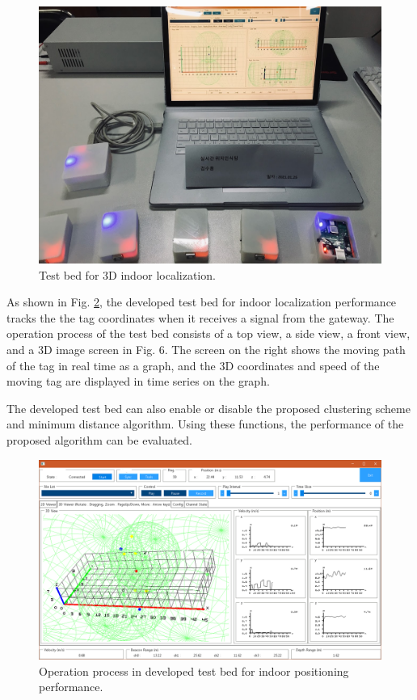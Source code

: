 \documentclass[conference]{IEEEtran}
\begin{document}
\begin{figure}[htbp]
    \centerline{\includegraphics[width=0.8\columnwidth]{fig10.jpg}}
    \caption{Test bed for 3D indoor localization.}
    \label{fig5}
\end{figure}


As shown in Fig. \ref{fig6}, the developed test bed for indoor localization performance tracks the the tag coordinates when it receives a signal from the gateway. The operation process of the test bed consists of a top view, a side view, a front view, and a 3D image screen in Fig. 6. The screen on the right shows the moving path of the tag in real time as a graph, and the 3D coordinates and speed of the moving tag are displayed in time series on the graph.

The developed test bed can also enable or disable the proposed clustering scheme and minimum distance algorithm. Using these functions, the performance of the proposed algorithm can be evaluated.

\begin{figure}[htbp]
    \centerline{\includegraphics[width=0.9\columnwidth]{fig5.png}}
    \caption{Operation process in developed test bed for indoor positioning performance.}
    \label{fig6}
\end{figure}
\end{document}
